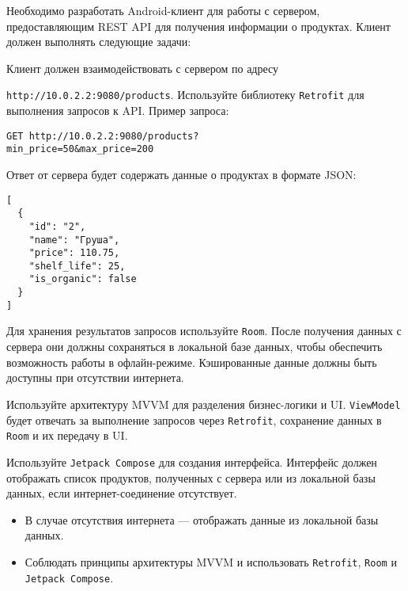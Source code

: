 
Необходимо разработать Android-клиент для работы с сервером, предоставляющим REST API для получения информации о продуктах. Клиент должен выполнять следующие задачи:

Клиент должен взаимодействовать с сервером по адресу 

\texttt{http://10.0.2.2:9080/products}. Используйте библиотеку \texttt{Retrofit} для выполнения запросов к API. Пример запроса:

\begin{verbatim}
GET http://10.0.2.2:9080/products?
min_price=50&max_price=200
\end{verbatim}

Ответ от сервера будет содержать данные о продуктах в формате JSON:

\begin{verbatim}
[
  {
    "id": "2",
    "name": "Груша",
    "price": 110.75,
    "shelf_life": 25,
    "is_organic": false
  }
]
\end{verbatim}

Для хранения результатов запросов используйте \texttt{Room}. После получения данных с сервера они должны сохраняться в локальной базе данных, чтобы обеспечить возможность работы в офлайн-режиме. Кэшированные данные должны быть доступны при отсутствии интернета.

Используйте архитектуру MVVM для разделения бизнес-логики и UI. \texttt{ViewModel} будет отвечать за выполнение запросов через \texttt{Retrofit}, сохранение данных в \texttt{Room} и их передачу в UI.

Используйте \texttt{Jetpack Compose} для создания интерфейса. Интерфейс должен отображать список продуктов, полученных с сервера или из локальной базы данных, если интернет-соединение отсутствует.

\begin{itemize}
  \item В случае отсутствия интернета — отображать данные из локальной базы данных.
  \item Соблюдать принципы архитектуры MVVM и использовать \texttt{Retrofit}, \texttt{Room} и \texttt{Jetpack Compose}.
\end{itemize}
